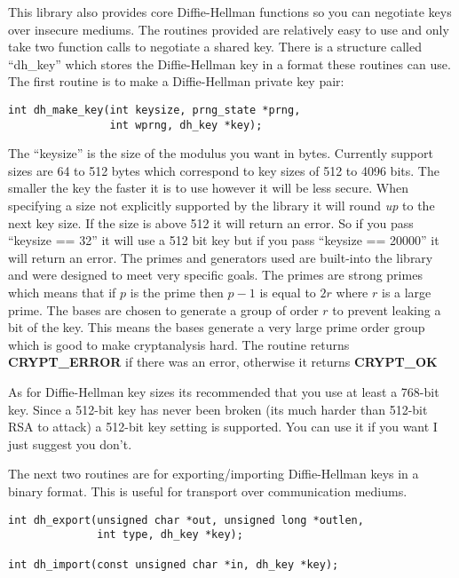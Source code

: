 \documentclass{book}
\begin{document}
This library also provides core Diffie-Hellman functions so you can negotiate keys over insecure mediums.  The routines 
provided are relatively easy to use and only take two function calls to negotiate a shared key.  There is a structure
called ``dh\_key'' which stores the Diffie-Hellman key in a format these routines can use.  The first routine is to
make a Diffie-Hellman private key pair:
\begin{verbatim}
int dh_make_key(int keysize, prng_state *prng, 
                int wprng, dh_key *key);
\end{verbatim}
The ``keysize'' is the size of the modulus you want in bytes.  Currently support sizes are 64 to 512 bytes which correspond 
to key sizes of 512 to 4096 bits. The smaller the key the faster it is to use however it will be less secure.  When 
specifying a size not explicitly supported by the library it will round {\em up} to the next key size.  If the size is 
above 512 it will return an error.  So if you pass ``keysize == 32'' it will use a 512 bit key but if you pass 
``keysize == 20000'' it will return an error.  The primes and generators used are built-into the library and were designed 
to meet very specific goals.  The primes are strong primes which means that if $p$ is the prime then
$p-1$ is equal to $2r$ where $r$ is a large prime.  The bases are chosen to generate a group of order $r$ to prevent
leaking a bit of the key.  This means the bases generate a very large prime order group which is good to make cryptanalysis
hard. The routine returns {\bf CRYPT\_ERROR} if there was an error, otherwise it returns {\bf CRYPT\_OK}

As for Diffie-Hellman key sizes its recommended that you use at least a 768-bit key.  Since a 512-bit key has never been broken (its much
harder than 512-bit RSA to attack) a 512-bit key setting is supported.  You can use it if you want I just suggest you don't.

The next two routines are for exporting/importing Diffie-Hellman keys in a binary format.  This is useful for transport
over communication mediums.  

 
\begin{verbatim}
int dh_export(unsigned char *out, unsigned long *outlen, 
              int type, dh_key *key);

int dh_import(const unsigned char *in, dh_key *key);
\end{verbatim}
\end{document}
